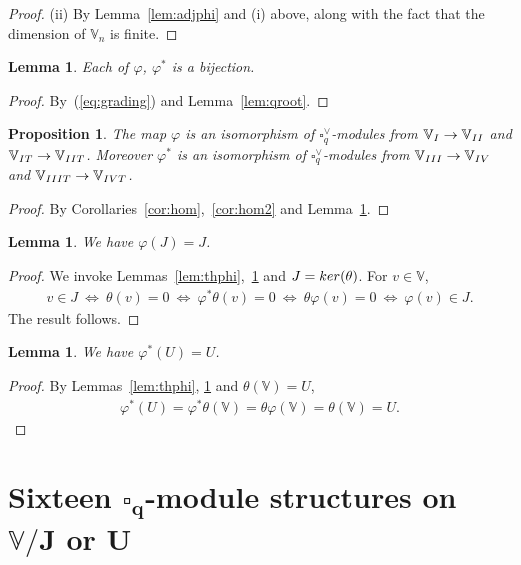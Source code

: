 \documentclass[11pt]{article}
\numberwithin{equation}{section}
\numberwithin{equation}{section}
\newtheorem{Lemma}[Theorem]{Lemma}
\newtheorem{Proposition}[Theorem]{Proposition}
 { \theoremstyle{definition}
\newtheorem{Definition}[Theorem]{Definition}
\newtheorem{Example}[Theorem]{Example}
\newtheorem{Note}[Theorem]{Note}
}
\begin{document}
{\begin{proof}
(ii) By Lemma~\ref{lem:adjphi} and (i) above, along with the fact that the dimension of $\mathbb V_n$ is finite.
\end{proof}

\begin{Lemma}\label{lem:bij}Each of $\varphi$, $\varphi^*$ is a bijection.
\end{Lemma}
\begin{proof}By~(\ref{eq:grading}) and Lemma~\ref{lem:qroot}.
\end{proof}

\begin{Proposition}\label{prop:expand}The map $\varphi$ is an isomorphism of $\square^\vee_q$-modules from
$\mathbb V_{\rm I} \to \mathbb V_{\rm II}$ and $\mathbb V_{\rm IT} \to\mathbb V_{\rm IIT}$. Moreover $\varphi^*$ is an isomorphism of $\square^\vee_q$-modules from $\mathbb V_{\rm III} \to \mathbb V_{\rm IV}$ and $\mathbb V_{\rm IIIT} \to \mathbb V_{\rm IVT}$.
\end{Proposition}
\begin{proof} By Corollaries~\ref{cor:hom},~\ref{cor:hom2} and Lemma~\ref{lem:bij}.
\end{proof}

\begin{Lemma}\label{lem:phiJU}We have $\varphi (J) = J$.
\end{Lemma}
\begin{proof} We invoke Lemmas~\ref{lem:thphi},~\ref{lem:bij} and $J={\rm ker}(\theta)$. For $v \in \mathbb V$,
\begin{gather*}
v \in J
\ \Leftrightarrow\
\theta(v) =0
\ \Leftrightarrow\
\varphi^* \theta(v) =0
\ \Leftrightarrow\
\theta \varphi(v) =0
\ \Leftrightarrow\
\varphi(v) \in J.
\end{gather*}
The result follows.
\end{proof}

\begin{Lemma}\label{lem:twoincl}We have $ \varphi^* (U) = U$.
\end{Lemma}
\begin{proof}By Lemmas~\ref{lem:thphi}, \ref{lem:bij} and $\theta(\mathbb V)=U$,
\begin{gather*}
\varphi^*(U) = \varphi^* \theta (\mathbb V) = \theta \varphi (\mathbb V)= \theta (\mathbb V) = U.\tag*{\qed}
\end{gather*}\renewcommand{\qed}{}
\end{proof}

\section[Sixteen $\square_q$-module structures on $\mathbb V/J$ or $U$]{Sixteen $\boldsymbol{\square_q}$-module structures on $\boldsymbol{\mathbb V/J}$ or $\boldsymbol{U}$}\label{section13}

}
\end{document}
